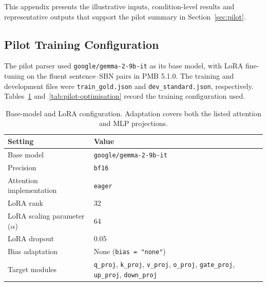 \documentclass{article}
\begin{document}
This appendix presents the illustrative inputs, condition-level results and
representative outputs that support the pilot summary in
Section~\ref{sec:pilot}.

\subsection{Pilot Training Configuration}
\label{app:pilot-training}

The pilot parser used \texttt{google/gemma-2-9b-it} as its base model,
with LoRA fine-tuning on the fluent sentence--SBN pairs in PMB 5.1.0.
The training and development files were \texttt{train\_gold.json} and
\texttt{dev\_standard.json}, respectively. Tables~\ref{tab:pilot-lora}
and~\ref{tab:pilot-optimisation} record the training configuration used.

\begin{table}[htbp]
\centering
\small
\begin{tabular}{@{}p{}p{}@{}}
\toprule
Setting & Value \\
\midrule
Base model & \texttt{google/gemma-2-9b-it} \\
Precision & \texttt{bf16} \\
Attention implementation & \texttt{eager} \\
LoRA rank & 32 \\
LoRA scaling parameter ($\alpha$) & 64 \\
LoRA dropout & 0.05 \\
Bias adaptation & None (\texttt{bias = "none"}) \\
Target modules & \texttt{q\_proj}, \texttt{k\_proj}, \texttt{v\_proj},
  \texttt{o\_proj}, \texttt{gate\_proj}, \texttt{up\_proj},
  \texttt{down\_proj} \\
\bottomrule
\end{tabular}
\caption{Base-model and LoRA configuration. Adaptation covers both the listed
attention and MLP projections.}
\label{tab:pilot-lora}
\end{table}
\end{document}
